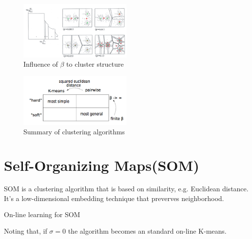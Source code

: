 \begin{figure}[hbt]
	\center
  \includegraphics[width=0.5\textwidth]{figures/cl-beta-cluster}
  \caption{Influence of $\beta$ to cluster structure}
\end{figure}

\begin{figure}[hbt]
	\center
  \includegraphics[width=0.5\textwidth]{figures/cl-summary}
  \caption{Summary of clustering algorithms}
\end{figure}

\section{Self-Organizing Maps(SOM)}
SOM is a clustering algorithm that is based on similarity, e.g. Euclidean distance. It's a low-dimensional embedding technique that preverves neighborhood.


\begin{algorithm}[H]
\caption{On-line learning for SOM}
\end{algorithm}

Noting that, if $\sigma = 0$ the algorithm becomes an standard on-line K-means.

